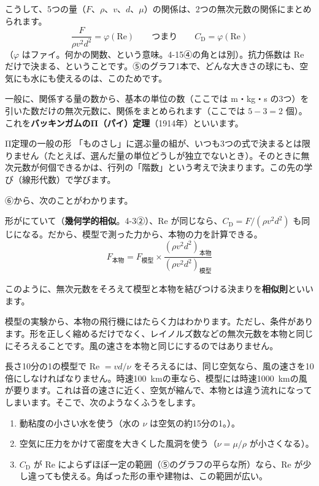 こうして、5つの量（$F$、$\rho$、$v$、$d$、$\mu$）の関係は、2つの無次元数の関係にまとめられます。
\[\frac{F}{\rho v^2d^2}=\varphi(\mathrm{Re})\qquad\text{つまり}\qquad C_{\mathrm D}=\varphi(\mathrm{Re})\]
（$\varphi$ はファイ。何かの関数、という意味。4-15④の角とは別）。抗力係数は Re だけで決まる、ということです。⑤のグラフ1本で、どんな大きさの球にも、空気にも水にも使えるのは、このためです。

一般に、関係する量の数から、基本の単位の数（ここでは m・kg・s の3つ）を引いた数だけの無次元数に、関係をまとめられます（ここでは $5-3=2$ 個）。これを\textbf{バッキンガムのΠ（パイ）定理}（1914年）といいます。

\begin{phsaki}{Π定理の一般の形}
「ものさし」に選ぶ量の組が、いつも3つの式で決まるとは限りません（たとえば、選んだ量の単位どうしが独立でないとき）。そのときに無次元数が何個できるかは、行列の「階数」という考えで決まります。この先の学び（線形代数）で学びます。
\end{phsaki}

\label{ph:力-15:sec7}⑥から、次のことがわかります。

\begin{taisetsu}
形がにていて（\textbf{幾何学的相似}。4-3②）、Re が同じなら、$C_{\mathrm D}=F/(\rho v^2d^2)$ も同じになる。だから、模型で測った力から、本物の力を計算できる。
\[F_{\text{本物}}=F_{\text{模型}}\times\frac{(\rho v^2d^2)_{\text{本物}}}{(\rho v^2d^2)_{\text{模型}}}\]
\end{taisetsu}
\noindent このように、無次元数をそろえて模型と本物を結びつける決まりを\textbf{相似則}といいます。

模型の実験から、本物の飛行機にはたらく力はわかります。ただし、条件があります。形を正しく縮めるだけでなく、レイノルズ数などの無次元数を本物と同じにそろえることです。風の速さを本物と同じにするのではありません。

長さ10分の1の模型で Re $=vd/\nu$ をそろえるには、同じ空気なら、風の速さを10倍にしなければなりません。時速\qty{100}{km}の車なら、模型には時速\qty{1000}{km}の風が要ります。これは音の速さに近く、空気が縮んで、本物とは違う流れになってしまいます。そこで、次のようなくふうをします。
\begin{enumerate}[label={\bkcircled{\arabic*}}, leftmargin=2.4\zw, itemsep=1pt, topsep=2pt]
\item 動粘度の小さい水を使う（水の $\nu$ は空気の約15分の1。\nobreak）。
\item 空気に圧力をかけて密度を大きくした風洞を使う（$\nu=\mu/\rho$ が小さくなる）。
\item $C_{\mathrm D}$ が Re によらずほぼ一定の範囲（⑤のグラフの平らな所）なら、Re が少し違っても使える。角ばった形の車や建物は、この範囲が広い。
\end{enumerate}

